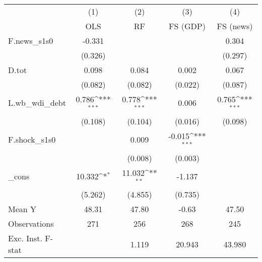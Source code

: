 {
\def\sym#1{\ifmmode^{#1}\else\(^{#1}\)\fi}
\begin{tabular}{l*{4}{c}}
\toprule
            &\multicolumn{1}{c}{(1)}&\multicolumn{1}{c}{(2)}&\multicolumn{1}{c}{(3)}&\multicolumn{1}{c}{(4)}\\
            &\multicolumn{1}{c}{OLS}&\multicolumn{1}{c}{RF}&\multicolumn{1}{c}{FS (GDP)}&\multicolumn{1}{c}{FS (news)}\\
\midrule
F.news\_s1s0 &      -0.331         &                     &                     &       0.304         \\
            &     (0.326)         &                     &                     &     (0.297)         \\
\addlinespace
D.tot       &       0.098         &       0.084         &       0.002         &       0.067         \\
            &     (0.082)         &     (0.082)         &     (0.022)         &     (0.087)         \\
\addlinespace
L.wb\_wdi\_debt&       0.786\sym{***}&       0.778\sym{***}&       0.006         &       0.765\sym{***}\\
            &     (0.108)         &     (0.104)         &     (0.016)         &     (0.098)         \\
\addlinespace
F.shock\_s1s0&                     &       0.009         &      -0.015\sym{***}&                     \\
            &                     &     (0.008)         &     (0.003)         &                     \\
\addlinespace
\_cons      &      10.332\sym{*}  &      11.032\sym{**} &      -1.137         &                     \\
            &     (5.262)         &     (4.855)         &     (0.735)         &                     \\
\midrule
Mean Y      &       48.31         &       47.80         &       -0.63         &       47.50         \\
Observations&         271         &         256         &         268         &         245         \\
Exc. Inst. F-stat&                     &       1.119         &      20.943         &      43.980         \\
\bottomrule
\end{tabular}
}
